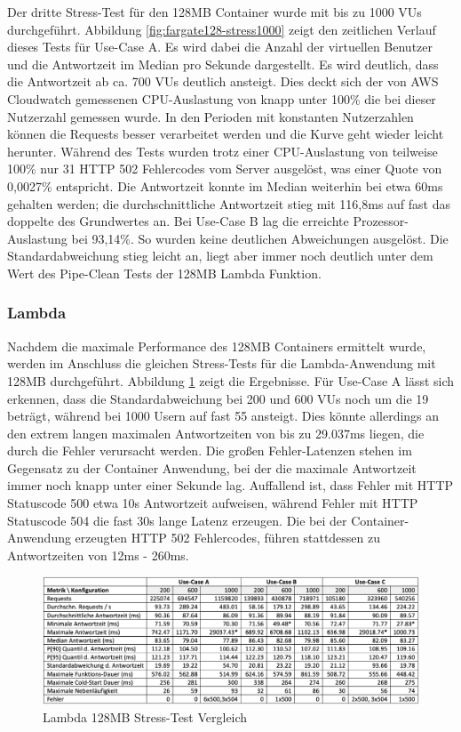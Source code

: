 Der dritte Stress-Test für den 128MB Container wurde mit bis zu 1000 VUs durchgeführt. Abbildung \ref{fig:fargate128-stress1000} zeigt den zeitlichen Verlauf dieses Tests für Use-Case A. Es wird dabei die Anzahl der virtuellen Benutzer und die Antwortzeit im Median pro Sekunde dargestellt. Es wird deutlich, dass die Antwortzeit ab ca. 700 VUs deutlich ansteigt. Dies deckt sich der von AWS Cloudwatch gemessenen CPU-Auslastung von knapp unter 100\% die bei dieser Nutzerzahl gemessen wurde. In den Perioden mit konstanten Nutzerzahlen können die Requests besser verarbeitet werden und die Kurve geht wieder leicht herunter. Während des Tests wurden trotz einer CPU-Auslastung von teilweise 100\% nur 31 HTTP 502 Fehlercodes vom Server ausgelöst, was einer Quote von 0,0027\% entspricht. Die Antwortzeit konnte im Median weiterhin bei etwa 60ms gehalten werden; die durchschnittliche Antwortzeit stieg mit 116,8ms auf fast das doppelte des Grundwertes an.  
Bei Use-Case B lag die erreichte Prozessor-Auslastung bei 93,14\%. So wurden keine deutlichen Abweichungen ausgelöst. Die Standardabweichung stieg leicht an, liegt aber immer noch deutlich unter dem Wert des Pipe-Clean Tests der 128MB Lambda Funktion.

\subsubsection{Lambda}
Nachdem die maximale Performance des 128MB Containers ermittelt wurde, werden im Anschluss die gleichen Stress-Tests für die Lambda-Anwendung mit 128MB durchgeführt. Abbildung \ref{fig:lambda128-stress-comparison} zeigt die Ergebnisse. Für Use-Case A lässt sich erkennen, dass die Standardabweichung bei 200 und 600 VUs noch um die 19 beträgt, während bei 1000 Usern auf fast 55 ansteigt. Dies könnte allerdings an den extrem langen maximalen Antwortzeiten von bis zu 29.037ms liegen, die durch die Fehler verursacht werden. Die großen Fehler-Latenzen stehen im Gegensatz zu der Container Anwendung, bei der die maximale Antwortzeit immer noch knapp unter einer Sekunde lag. Auffallend ist, dass Fehler mit HTTP Statuscode 500 etwa 10s Antwortzeit aufweisen, während Fehler mit HTTP Statuscode 504 die fast 30s lange Latenz erzeugen. Die bei der Container-Anwendung erzeugten HTTP 502 Fehlercodes, führen stattdessen zu  Antwortzeiten von 12ms - 260ms. 

\begin{figure}[H]
    \includegraphics[width=\textwidth]{img/lambda128-stress-comparison.png}
    \caption[Lambda 128MB Stress-Test Vergleich]{Lambda 128MB Stress-Test Vergleich}
    \label{fig:lambda128-stress-comparison}
\end{figure}

